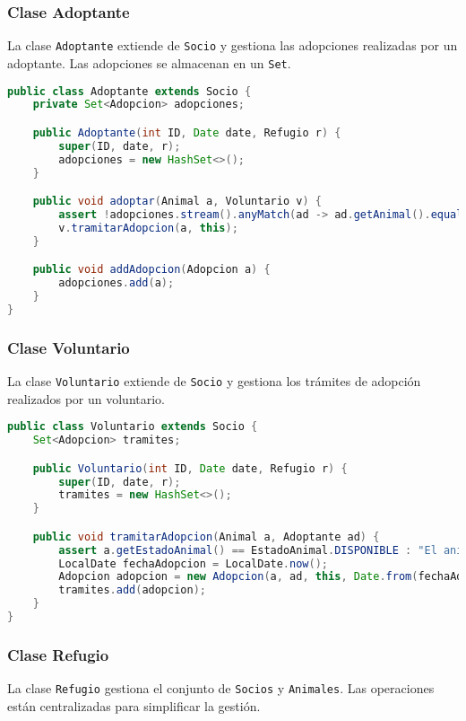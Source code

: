 \subsubsection{Clase Adoptante}
La clase \texttt{Adoptante} extiende de \texttt{Socio} y gestiona las adopciones realizadas por un adoptante. Las adopciones se almacenan en un \texttt{Set}.

\begin{lstlisting}[language=Java]
public class Adoptante extends Socio {
    private Set<Adopcion> adopciones;

    public Adoptante(int ID, Date date, Refugio r) {
        super(ID, date, r);
        adopciones = new HashSet<>();
    }

    public void adoptar(Animal a, Voluntario v) {
        assert !adopciones.stream().anyMatch(ad -> ad.getAnimal().equals(a)) : "El adoptante ya tiene registrado este animal";
        v.tramitarAdopcion(a, this);
    }

    public void addAdopcion(Adopcion a) {
        adopciones.add(a);
    }
}
\end{lstlisting}

\subsubsection{Clase Voluntario}
La clase \texttt{Voluntario} extiende de \texttt{Socio} y gestiona los trámites de adopción realizados por un voluntario.

\begin{lstlisting}[language=Java]
public class Voluntario extends Socio {
    Set<Adopcion> tramites;

    public Voluntario(int ID, Date date, Refugio r) {
        super(ID, date, r);
        tramites = new HashSet<>();
    }

    public void tramitarAdopcion(Animal a, Adoptante ad) {
        assert a.getEstadoAnimal() == EstadoAnimal.DISPONIBLE : "El animal ya esta adoptado.";
        LocalDate fechaAdopcion = LocalDate.now();
        Adopcion adopcion = new Adopcion(a, ad, this, Date.from(fechaAdopcion.atStartOfDay(ZoneId.systemDefault()).toInstant()));
        tramites.add(adopcion);
    }
}
\end{lstlisting}

\subsubsection{Clase Refugio}
La clase \texttt{Refugio} gestiona el conjunto de \texttt{Socios} y \texttt{Animales}. Las operaciones están centralizadas para simplificar la gestión.

